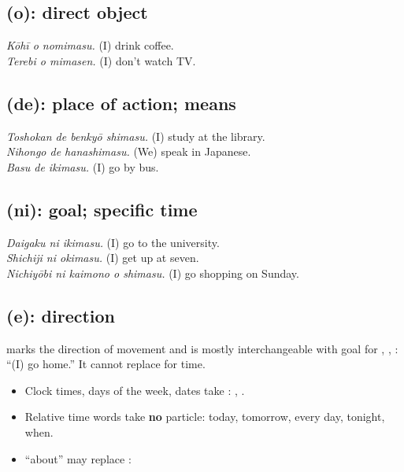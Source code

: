 \subsection{ (o): direct object}
 \emph{Kōhī o nomimasu.} (I) drink coffee.\\
 \emph{Terebi o mimasen.} (I) don't watch TV.

\subsection{ (de): place of action; means}
 \emph{Toshokan de benkyō shimasu.}
(I) study at the library.\\
 \emph{Nihongo de hanashimasu.} (We) speak in Japanese.\\
 \emph{Basu de ikimasu.} (I) go by bus.

\subsection{ (ni): goal; specific time}
 \emph{Daigaku ni ikimasu.} (I) go to the university.\\
 \emph{Shichiji ni okimasu.} (I) get up at seven.\\
 \emph{Nichiyōbi ni kaimono o shimasu.}
(I) go shopping on Sunday.

\subsection{ (e): direction}
 marks the direction of movement and is mostly interchangeable with goal
 for , , :  ``(I) go
home.'' It cannot replace  for time.

\begin{important}
\begin{itemize}
  \item Clock times, days of the week, dates take : , .
  \item Relative time words take \textbf{no} particle:  today, 
        tomorrow,  every day,  tonight,  when.
  \item {} ``about'' may replace : 
\end{itemize}
\end{important}

